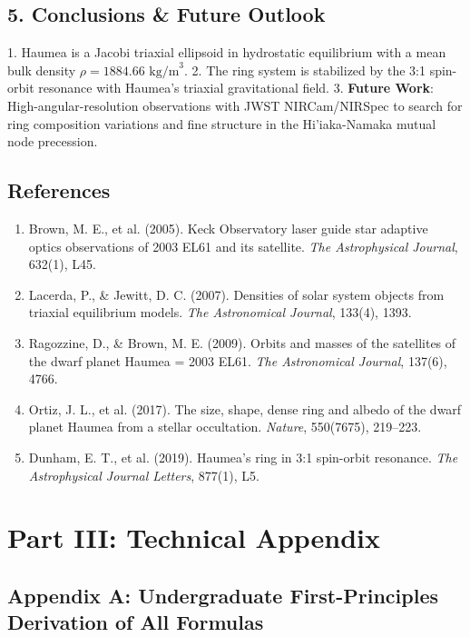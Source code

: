 \documentclass[11pt,a4paper]{article}
\begin{document}
\subsection*{5. Conclusions \& Future Outlook}
1. Haumea is a Jacobi triaxial ellipsoid in hydrostatic equilibrium with a mean bulk density $\rho = 1884.66\text{ kg/m}^3$.
2. The ring system is stabilized by the 3:1 spin-orbit resonance with Haumea's triaxial gravitational field.
3. \textbf{Future Work}: High-angular-resolution observations with JWST NIRCam/NIRSpec to search for ring composition variations and fine structure in the Hi'iaka-Namaka mutual node precession.

\subsection*{References}
\begin{enumerate}
    \item Brown, M. E., et al. (2005). Keck Observatory laser guide star adaptive optics observations of 2003 EL61 and its satellite. \textit{The Astrophysical Journal}, 632(1), L45.
    \item Lacerda, P., \& Jewitt, D. C. (2007). Densities of solar system objects from triaxial equilibrium models. \textit{The Astronomical Journal}, 133(4), 1393.
    \item Ragozzine, D., \& Brown, M. E. (2009). Orbits and masses of the satellites of the dwarf planet Haumea = 2003 EL61. \textit{The Astronomical Journal}, 137(6), 4766.
    \item Ortiz, J. L., et al. (2017). The size, shape, dense ring and albedo of the dwarf planet Haumea from a stellar occultation. \textit{Nature}, 550(7675), 219--223.
    \item Dunham, E. T., et al. (2019). Haumea's ring in 3:1 spin-orbit resonance. \textit{The Astrophysical Journal Letters}, 877(1), L5.
\end{enumerate}

\newpage

\section*{Part III: Technical Appendix}

\subsection*{Appendix A: Undergraduate First-Principles Derivation of All Formulas}
\end{document}
